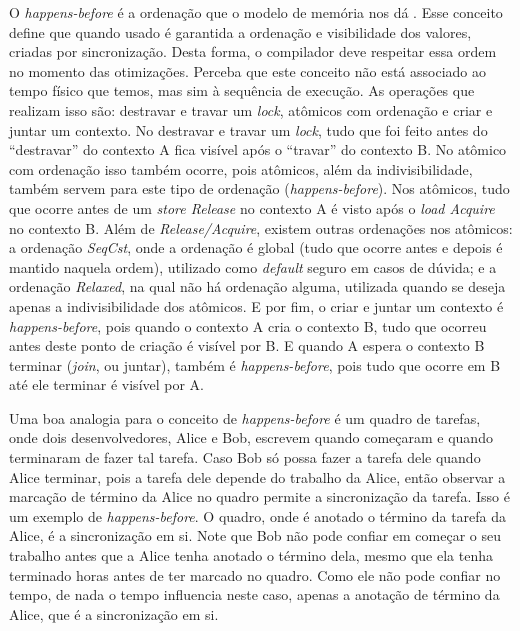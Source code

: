 O \textit{happens-before} é a ordenação que o modelo de memória nos dá \citep{boehm2008foundations}. Esse conceito define que quando usado é garantida a ordenação e visibilidade dos valores, criadas por sincronização. Desta forma, o compilador deve respeitar essa ordem no momento das otimizações. Perceba que este conceito não está associado ao tempo físico que temos, mas sim à sequência de execução. As operações que realizam isso são: destravar e travar um \textit{lock}, atômicos com ordenação e criar e juntar um contexto. No destravar e travar um \textit{lock}, tudo que foi feito antes do ``destravar'' do contexto A fica visível após o ``travar'' do contexto B. No atômico com ordenação isso também ocorre, pois atômicos, além da indivisibilidade, também servem para este tipo de ordenação (\textit{happens-before}). Nos atômicos, tudo que ocorre antes de um \textit{store Release} no contexto A é visto após o \textit{load Acquire} no contexto B. Além de \textit{Release/Acquire}, existem outras ordenações nos atômicos: a ordenação \textit{SeqCst}, onde a ordenação é global (tudo que ocorre antes e depois é mantido naquela ordem), utilizado como \textit{default} seguro em casos de dúvida; e a ordenação \textit{Relaxed}, na qual não há ordenação alguma, utilizada quando se deseja apenas a indivisibilidade dos atômicos. E por fim, o criar e juntar um contexto é \textit{happens-before}, pois quando o contexto A cria o contexto B, tudo que ocorreu antes deste ponto de criação é visível por B. E quando A espera o contexto B terminar (\textit{join}, ou juntar), também é \textit{happens-before}, pois tudo que ocorre em B até ele terminar é visível por A.

Uma boa analogia para o conceito de \textit{happens-before} é um quadro de tarefas, onde dois desenvolvedores, Alice e Bob, escrevem quando começaram e quando terminaram de fazer tal tarefa. Caso Bob só possa fazer a tarefa dele quando Alice terminar, pois a tarefa dele depende do trabalho da Alice, então observar a marcação de término da Alice no quadro permite a sincronização da tarefa. Isso é um exemplo de \textit{happens-before}. O quadro, onde é anotado o término da tarefa da Alice, é a sincronização em si. Note que Bob não pode confiar em começar o seu trabalho antes que a Alice tenha anotado o término dela, mesmo que ela tenha terminado horas antes de ter marcado no quadro. Como ele não pode confiar no tempo, de nada o tempo influencia neste caso, apenas a anotação de término da Alice, que é a sincronização em si.

